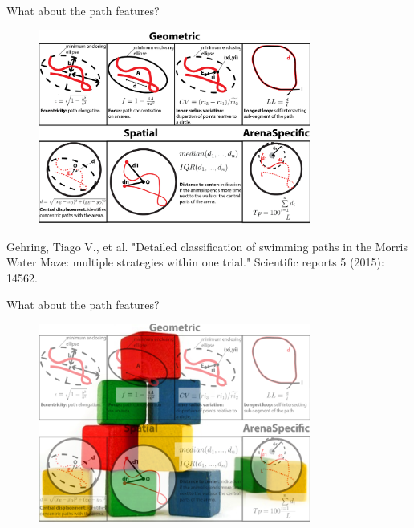 \documentclass{beamer}
\begin{document}
{\begin{frame}{What about the path features?}
	\begin{figure}[H]
		\centering
		\includegraphics[width=0.8\textwidth]{figures/features}
	\end{figure}
	\tiny{Gehring, Tiago V., et al. "Detailed classification of swimming paths in the Morris Water Maze: multiple strategies within one trial." Scientific reports 5 (2015): 14562.}		
\end{frame}

\begin{frame}{What about the path features?}
	\begin{figure}[H]
		\centering
		\includegraphics[width=0.8\textwidth]{figures/buildingblocks2}
	\end{figure}
\end{frame}

}
\end{document}
